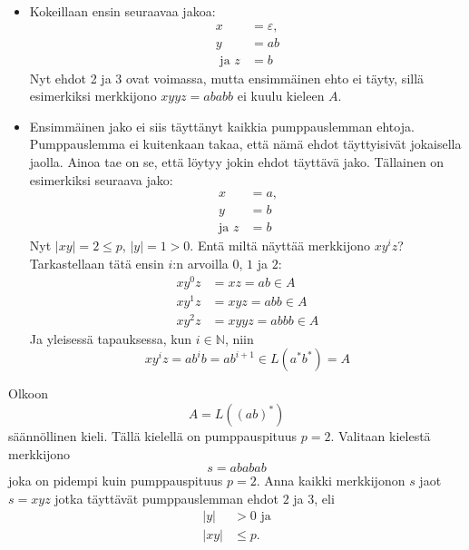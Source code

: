 \documentclass[a4paper,11pt]{article}
\theoremstyle{definition}
\newcommand{\Nat}{\mathbb{N}}
\begin{document}
\begin{itemize}
    \item Kokeillaan ensin seuraavaa jakoa:
        \begin{align*}
             x               & = \varepsilon,  \\
             y               & = ab            \\
            \textrm{ ja }  z & = b
        \end{align*}
        Nyt ehdot 2 ja 3 ovat voimassa, mutta ensimmäinen ehto ei täyty, sillä
        esimerkiksi merkkijono $xyyz = ababb$ ei kuulu kieleen $A$.

    \item Ensimmäinen jako ei siis täyttänyt kaikkia pumppauslemman ehtoja.
        Pumppauslemma ei kuitenkaan takaa, että nämä ehdot täyttyisivät
        jokaisella jaolla. Ainoa tae on se, että löytyy jokin ehdot täyttävä
        jako. Tällainen on esimerkiksi seuraava jako:
        \begin{align*}
            x              & = a \textrm{,} \\
            y              & = b \\
            \textrm{ja } z & = b
        \end{align*}
        Nyt $|xy| = 2 \leq p$, $|y| = 1 > 0$. Entä miltä näyttää merkkijono
        $xy^iz$? Tarkastellaan tätä ensin $i$:n arvoilla $0$, $1$ ja $2$:
        \begin{align*}
            xy^0z & = xz  = ab \in A \\
            xy^1z & = xyz = abb \in A \\
            xy^2z & = xyyz = abbb \in A
        \end{align*}
        Ja yleisessä tapauksessa, kun $i \in \Nat$, niin
        \begin{equation*}
            xy^iz = ab^ib = ab^{i+1} \in L(a^*b^*) = A
        \end{equation*}
\end{itemize}

\begin{exercise}
    Olkoon
    \begin{equation*}
        A = L((ab)^*)
    \end{equation*}
    säännöllinen kieli. Tällä kielellä on pumppauspituus $p = 2$. Valitaan
    kielestä merkkijono
    \begin{equation*}
        s = ababab
    \end{equation*}
    joka on pidempi kuin pumppauspituus $p = 2$.  Anna kaikki merkkijonon $s$
    jaot $s = xyz$ jotka täyttävät pumppauslemman ehdot $2$ ja $3$, eli 
    \begin{align*}
        |y|  & > 0 \textrm{ ja} \\
        |xy| & \leq p \text{.}
    \end{align*}
\end{exercise}
\end{document}

